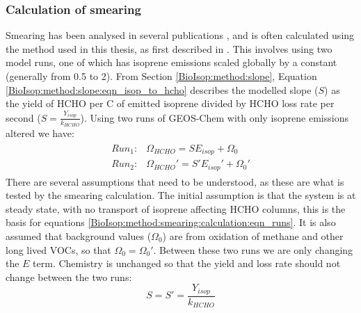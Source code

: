     \subsubsection{Calculation of smearing}
      \label{BioIsop:method:smearing:calculation}
      
      Smearing has been analysed in several publications \parencite[e.g.][]{Martin2003, Palmer2003, Millet2006, Stavrakou2009, Marais2012, Barkley2013, Zhu2014, Wolfe2016, Surl2018}, and is often calculated using the method used in this thesis, as first described in \textcite{Palmer2003}.
      This involves using two model runs, one of which has isoprene emissions scaled globally by a constant (generally from 0.5 to 2).
      From Section \ref{BioIsop:method:slope}, Equation \ref{BioIsop:method:slope:eqn_isop_to_hcho} describes the modelled slope ($S$) as the yield of HCHO per C of emitted isoprene divided by HCHO loss rate per second ($S = \frac{Y_{isop}}{k_{HCHO}}$).
      Using two runs of GEOS-Chem with only isoprene emissions altered we have:
      \begin{eqnarray}
        \label{BioIsop:method:smearing:calculation:eqn_runs}
        \begin{split}
        Run_1 :&  \Omega_{HCHO} = S E_{isop} + \Omega_0 \\
        Run_2 :&  \Omega_{HCHO}' = S' E_{isop}' + \Omega_0' 
        \end{split}
      \end{eqnarray}
      There are several assumptions that need to be understood, as these are what is tested by the smearing calculation.
      The initial assumption is that the system is at steady state, with no transport of isoprene affecting HCHO columns, this is the basis for equations \ref{BioIsop:method:smearing:calculation:eqn_runs}.
      It is also assumed that background values ($\Omega_0$) are from oxidation of methane and other long lived VOCs, so that $\Omega_0 = \Omega_0'$.
      Between these two runs we are only changing the $E$ term.
      Chemistry is unchanged so that the yield and loss rate should not change between the two runs: 
      \begin{equation}
        S = S' = \frac{Y_{isop}}{k_{HCHO}}
      \end{equation}
